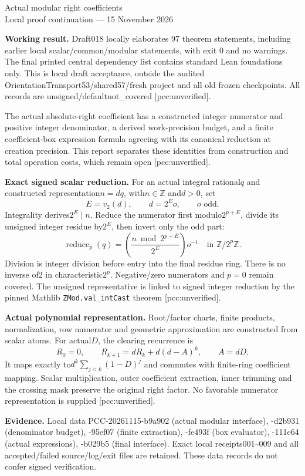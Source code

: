 \documentclass[10pt]{article}
\begin{document}
\begin{center}{\Large Actual modular right coefficients}\\[4pt]
Local proof continuation --- 15 November 2026\end{center}
\textbf{Working result.} Draft018 locally elaborates 97 theorem statements,
including earlier local scalar/common/modular statements, with exit 0 and no
warnings. The final printed central dependency list contains standard Lean
foundations only. This is local draft acceptance, outside the audited
OrientationTransport53/shared57/fresh project and all old frozen checkpoints.
All records are unsigned/defaultnot\_covered [pcc:unverified].

The actual absolute-right coefficient has a constructed integer numerator
and positive integer denominator, a derived work-precision budget, and a
finite coefficient-box expression formula agreeing with its canonical
reduction at creation precision. This report separates these identities from
construction and total operation costs, which remain open [pcc:unverified].

\textbf{Exact signed scalar reduction.} For an actual integral rational$q$
and constructed representation$n=dq$, with$n\in\mathbb Z$ and$d>0$, set
\[
 E=v_2(d),\qquad d=2^E o,\qquad o\text{ odd}.
\]
Integrality derives$2^E\mid n$. Reduce the numerator first modulo$2^{p+E}$,
divide its unsigned integer residue by$2^E$, then invert only the odd part:
\[
 \operatorname{reduce}_p(q)=
 \left(\frac{n\bmod 2^{p+E}}{2^E}\right)o^{-1}
 \quad\text{in }\mathbb Z/2^p\mathbb Z.
\]
Division is integer division before entry into the final residue ring.
There is no inverse of2 in characteristic$2^p$. Negative/zero numerators and
$p=0$ remain covered. The unsigned representative is linked to signed integer
reduction by the pinned Mathlib \texttt{ZMod.val\_intCast} theorem
[pcc:unverified].

\textbf{Actual polynomial representation.} Root/factor charts, finite
products, normalization, row numerator and geometric approximation are
constructed from scalar atoms. For actual$D$, the clearing recurrence is
\[
 R_0=0,\qquad R_{k+1}=dR_k+d(d-A)^k,\qquad A=dD.
\]
It maps exactly to$d^k\sum_{j<k}(1-D)^j$ and commutes with finite-ring
coefficient mapping. Scalar multiplication, outer coefficient extraction,
inner trimming and the crossing mask preserve the original right factor.
No favorable numerator representation is supplied [pcc:unverified].

\textbf{Evidence.} Local data PCC-20261115-b9a902 (actual modular interface),
-d2b931 (denominator budget), -95ef07 (finite extraction), -fe493f
(box evaluator), -111e64 (actual expressions), -b029b5 (final interface).
Exact local receipts001--009 and all accepted/failed source/log/exit files
are retained. These data records do not confer signed verification.
\end{document}
